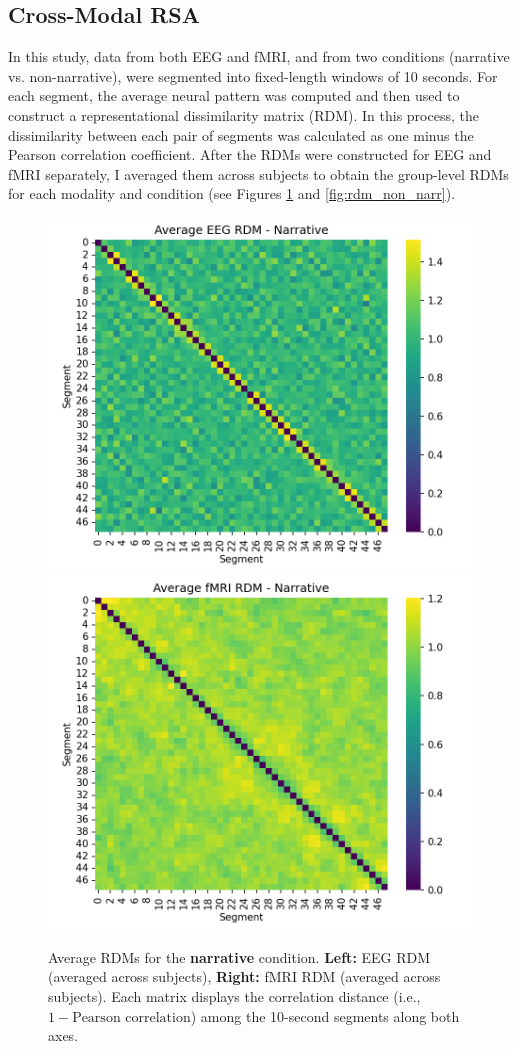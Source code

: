 \documentclass[stu,12pt,floatsintext]{apa7}
\begin{document}
\subsection{Cross-Modal RSA}
In this study, data from both EEG and fMRI, and from two conditions (narrative vs. non-narrative), were segmented into fixed-length windows of 10 seconds. For each segment, the average neural pattern was computed and then used to construct a representational dissimilarity matrix (RDM). In this process, the dissimilarity between each pair of segments was calculated as one minus the Pearson correlation coefficient. After the RDMs were constructed for EEG and fMRI separately, I averaged them across subjects to obtain the group-level RDMs for each modality and condition (see Figures \ref{fig:rdm_narr} and  \ref{fig:rdm_non_narr}).

\begin{figure}[ht!]
\centering
\includegraphics[width=0.45\linewidth]{Results/Plots/Avg_EEG_RDM_narr.png}
\hfill
\includegraphics[width=0.45\linewidth]{Results/Plots/Avg_fMRI_RDM_narr.png}
\caption{Average RDMs for the \textbf{narrative} condition. 
\textbf{Left:} EEG RDM (averaged across subjects), 
\textbf{Right:} fMRI RDM (averaged across subjects). 
Each matrix displays the correlation distance (i.e., $1 - \text{Pearson correlation}$) among the 10-second segments along both axes.}
\label{fig:rdm_narr}
\end{figure}
\end{document}
